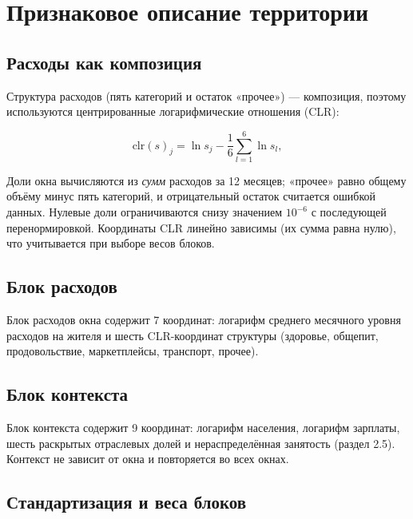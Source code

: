\documentclass[11pt,a4paper]{article}
\begin{document}
\section{Признаковое описание территории}\label{ux43fux440ux438ux437ux43dux430ux43aux43eux432ux43eux435-ux43eux43fux438ux441ux430ux43dux438ux435-ux442ux435ux440ux440ux438ux442ux43eux440ux438ux438}

\subsection{Расходы как композиция}\label{ux440ux430ux441ux445ux43eux434ux44b-ux43aux430ux43a-ux43aux43eux43cux43fux43eux437ux438ux446ux438ux44f}

Структура расходов (пять категорий и остаток «прочее») --- композиция, поэтому используются центрированные логарифмические отношения (CLR):

\[\mathrm{clr}(s)_j = \ln s_j - \frac{1}{6}\sum_{l=1}^{6}\ln s_l ,\]

Доли окна вычисляются из \emph{сумм} расходов за 12 месяцев; «прочее» равно общему объёму минус пять категорий, и отрицательный остаток считается ошибкой данных. Нулевые доли ограничиваются снизу значением \(10^{-6}\) с последующей перенормировкой. Координаты CLR линейно зависимы (их сумма равна нулю), что учитывается при выборе весов блоков.

\subsection{Блок расходов}\label{ux431ux43bux43eux43a-ux440ux430ux441ux445ux43eux434ux43eux432}

Блок расходов окна содержит 7 координат: логарифм среднего месячного уровня расходов на жителя и шесть CLR-координат структуры (здоровье, общепит, продовольствие, маркетплейсы, транспорт, прочее).

\subsection{Блок контекста}\label{ux431ux43bux43eux43a-ux43aux43eux43dux442ux435ux43aux441ux442ux430}

Блок контекста содержит 9 координат: логарифм населения, логарифм зарплаты, шесть раскрытых отраслевых долей и нераспределённая занятость (раздел 2.5). Контекст не зависит от окна и повторяется во всех окнах.

\subsection{Стандартизация и веса блоков}\label{ux441ux442ux430ux43dux434ux430ux440ux442ux438ux437ux430ux446ux438ux44f-ux438-ux432ux435ux441ux430-ux431ux43bux43eux43aux43eux432}
\end{document}
